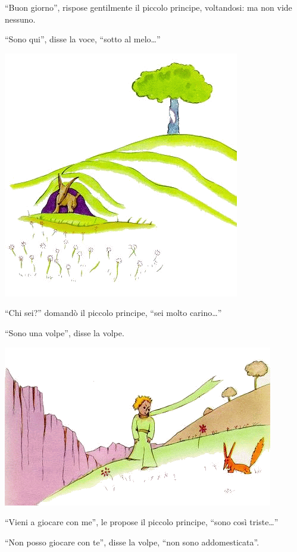 \documentclass[11pt]{scrbook}
\begin{document}
``Buon giorno'', rispose gentilmente il piccolo principe, voltandosi: ma non vide nessuno.

``Sono qui'', disse la voce, ``sotto al melo\ldots{}''

\begin{center}
\includegraphics{img/21b}
\end{center}

``Chi sei?'' domandò il piccolo principe, ``sei molto carino\ldots{}''

``Sono una volpe'', disse la volpe.

\begin{center}
\includegraphics{img/21a}
\end{center}

``Vieni a giocare con me'', le propose il piccolo principe, ``sono così triste\ldots{}''

``Non posso giocare con te'', disse la volpe, ``non sono addomesticata''.
\end{document}
